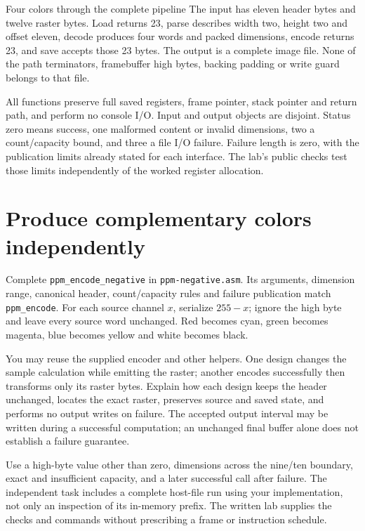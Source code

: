 \begin{MARSWorkedExample}{Four colors through the complete pipeline}
  The input has eleven header bytes and twelve raster bytes. Load returns 23,
  parse describes width two, height two and offset eleven, decode produces four
  words and packed dimensions, encode returns 23, and save accepts those 23 bytes.
  The output is a complete image file. None of the path terminators, framebuffer
  high bytes, backing padding or write guard belongs to that file.
\end{MARSWorkedExample}

All functions preserve full saved registers, frame pointer, stack pointer and
return path, and perform no console I/O. Input and output objects are disjoint.
Status zero means success, one malformed content or invalid dimensions, two a
count/capacity bound, and three a file I/O failure. Failure length is zero, with
the publication limits already stated for each interface. The lab's public
checks test those limits independently of the worked register allocation.

\section{Produce complementary colors independently}

Complete \texttt{ppm\_encode\_negative} in \texttt{ppm-negative.asm}. Its arguments,
dimension range, canonical header, count/capacity rules and failure publication
match \texttt{ppm\_encode}. For each source channel $x$, serialize $255-x$;
ignore the high byte and leave every source word unchanged. Red becomes cyan,
green becomes magenta, blue becomes yellow and white becomes black.

You may reuse the supplied encoder and other helpers. One design changes the
sample calculation while emitting the raster; another encodes successfully then
transforms only its raster bytes. Explain how each design keeps the header
unchanged, locates the exact raster, preserves source and saved state, and
performs no output writes on failure. The accepted output interval may be
written during a successful computation; an unchanged final buffer alone does
not establish a failure guarantee.

Use a high-byte value other than zero, dimensions across the nine/ten boundary,
exact and insufficient capacity, and a later successful call after failure.
The independent task includes a complete host-file run using your implementation,
not only an inspection of its in-memory prefix. The written lab supplies the
checks and commands without prescribing a frame or instruction schedule.

